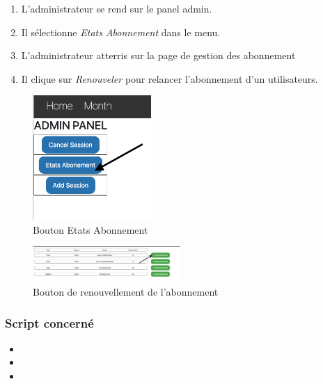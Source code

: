 \begin{enumerate}
	\item L'administrateur se rend sur le panel admin. 
	\item Il sélectionne \textit{Etats Abonnement} dans le menu. 
	\item L'administrateur atterris sur la page de gestion des abonnement 
	\item Il clique sur \textit{Renouveler} pour relancer l'abonnement d'un utilisateurs. 
\end{enumerate}

\begin{figure}[h]
	\includegraphics[width=0.4\textwidth,center]{Figures/us11-1}
	\caption{Bouton Etats Abonnement}
\end{figure}

\vspace{\baselineskip}
\vspace{\baselineskip}
\begin{figure}[h]
	\includegraphics[width=0.5\textwidth,center]{Figures/us11-2}
	\caption{Bouton de renouvellement de l'abonnement}
\end{figure}

\vspace{\baselineskip}
\subsubsection{Script concerné}
	\begin{itemize}
		\item {}
		\item {}
		\item {}
	\end{itemize}